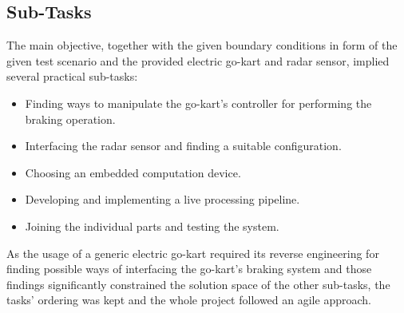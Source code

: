 \subsection{Sub-Tasks}

The main objective, together with the given boundary conditions in form of the given test scenario and the provided electric go-kart and radar sensor, implied several practical sub-tasks:
\begin{itemize}
    \item Finding ways to manipulate the go-kart’s controller for performing the braking operation.
    \item Interfacing the radar sensor and finding a suitable configuration.
    \item Choosing an embedded computation device.
    \item Developing and implementing a live processing pipeline.
    \item Joining the individual parts and testing the system.
\end{itemize}
As the usage of a generic electric go-kart required its reverse engineering for finding possible ways of interfacing the go-kart's braking system and those findings significantly constrained the solution space of the other sub-tasks, the tasks' ordering was kept and the whole project followed an agile approach.